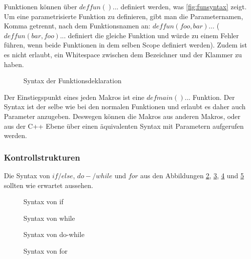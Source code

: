       Funktionen können über \myMIn$def fun(){...}$ definiert werden, was \autoref{fig:funsyntax} zeigt. Um eine parametrisierte Funktion zu definieren, gibt man die Parameternamen, Komma getrennt, nach dem Funktionsnamen an: \myMIn$def fun(foo, bar){...}$ (\myMIn$def fun(bar, foo){...}$ definiert die gleiche Funktion und würde zu einem Fehler führen, wenn beide Funktionen in dem selben Scope definiert werden). Zudem ist es nicht erlaubt, ein Whitespace zwischen dem Bezeichner und der Klammer zu haben.
      \begin{figure}[H]
        \centering
        \caption{Syntax der Funktionsdeklaration}
        \label{fig:funsyntax}
      \end{figure}
      Der Einstiegspunkt eines jeden Makros ist eine \myMIn$def main(){...}$ Funktion. Der Syntax ist der selbe wie bei den normalen Funktionen und erlaubt es daher auch Parameter anzugeben. Deswegen können die Makros aus anderen Makros, oder aus der C++ Ebene über einen äquivalenten Syntax mit Parametern aufgerufen werden.

    \subsubsection{Kontrollstrukturen}
    \label{sssec:Kontrollstrukturen}
      Die Syntax von \myMIn$if/else$, \myMIn$do-/while$ und \myMIn$for$ aus den Abbildungen \ref{fig:ifsyntax}, \ref{fig:whilesyntax}, \ref{fig:dowhilesyntax} und \ref{fig:forsyntax} sollten wie erwartet aussehen.
      \begin{figure}[H]
        \centering
        \caption{Syntax von if}
        \label{fig:ifsyntax}
      \end{figure}

      \begin{figure}[H]
        \centering
        \caption{Syntax von while}
        \label{fig:whilesyntax}
      \end{figure}

      \begin{figure}[H]
        \centering
        \caption{Syntax von do-while}
        \label{fig:dowhilesyntax}
      \end{figure}

      \begin{figure}[H]
        \centering
        \caption{Syntax von for}
        \label{fig:forsyntax}
      \end{figure}

